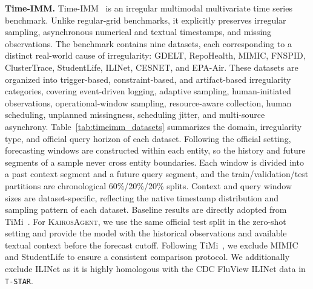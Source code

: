 \documentclass[11pt]{article}
\newcommand{\method}{\textsc{KairosAgent}\xspace}
\newcommand{\minisection}[1]{\vspace{5pt}\noindent\textbf{#1.}}
\begin{document}
\minisection{Time-IMM}
Time-IMM~\citep{chang2026time} is an irregular multimodal multivariate time series benchmark.
Unlike regular-grid benchmarks, it explicitly preserves irregular sampling, asynchronous numerical and textual timestamps, and missing observations.
The benchmark contains nine datasets, each corresponding to a distinct real-world cause of irregularity: GDELT, RepoHealth, MIMIC, FNSPID, ClusterTrace, StudentLife, ILINet, CESNET, and EPA-Air.
These datasets are organized into trigger-based, constraint-based, and artifact-based irregularity categories, covering event-driven logging, adaptive sampling, human-initiated observations, operational-window sampling, resource-aware collection, human scheduling, unplanned missingness, scheduling jitter, and multi-source asynchrony.
Table~\ref{tab:timeimm_datasets} summarizes the domain, irregularity type, and official query horizon of each dataset.
Following the official setting, forecasting windows are constructed within each entity, so the history and future segments of a sample never cross entity boundaries.
Each window is divided into a past context segment and a future query segment, and the train/validation/test partitions are chronological 60\%/20\%/20\% splits.
Context and query window sizes are dataset-specific, reflecting the native timestamp distribution and sampling pattern of each dataset.
Baseline results are directly adopted from TiMi~\citep{lin2026timi}.
For \method, we use the same official test split in the zero-shot setting and provide the model with the historical observations and available textual context before the forecast cutoff.
Following TiMi~\citep{lin2026timi}, we exclude MIMIC and StudentLife to ensure a consistent comparison protocol.
We additionally exclude ILINet as it is highly homologous with the CDC FluView ILINet data in \texttt{T-STAR}.
\end{document}
